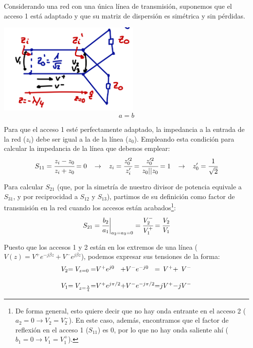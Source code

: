 \documentclass[12pt]{article}
\begin{document}
Considerando una red con una \'unica l\'inea de transmisi\'on, suponemos que el acceso 1 est\'a adaptado y que su matriz de dispersi\'on es sim\'etrica y sin p\'erdidas.
\begin{center}
	\includegraphics[width=7cm]{img/Divisor_en_lambda4_A_detalle.jpg}$$a=b$$
\end{center}

Para que el acceso 1 est\'e perfectamente adaptado, la impedancia a la entrada de la red ($z_i$) debe ser igual a la de la l\'inea ($z_0$). Empleando esta condici\'on para calcular la impedancia de la l\'inea que debenos emplear:
$$S_{11} = \cfrac{z_i - z_0}{z_i + z_0} = 0
\hspace{3mm}\rightarrow\hspace{3mm}
z_i = \cfrac{z'^2_0}{z'_i} = \cfrac{z'^2_0}{z_0 || z_0} = 1
\hspace{3mm}\rightarrow\hspace{3mm}
z'_0 = \cfrac{1}{\sqrt{2}}$$

Para calcular $S_{21}$ (que, por la simetr\'ia de nuestro divisor de potencia equivale a $S_{31}$, y por reciprocidad a $S_{12}$ y $S_{13}$), partimos de su definici\'on como factor de transmisi\'on en la red cuando los accesos est\'an acabados\footnote{De forma general, esto quiere decir que no hay onda entrante en el acceso 2 ($a_2 = 0 \rightarrow V_2 = V_2^-$). En este caso, adem\'as, encontramos que el factor de reflexi\'on en el acceso 1 ($S_{11}$) es 0, por lo que no hay onda saliente ah\'i ($b_1 = 0 \rightarrow V_1 = V_1^+$).}:
$$S_{21} = \cfrac{b_2}{a_1}\bigg|_{a_2 = a_3 = 0} = \cfrac{V_2^-}{V_1^+} = \cfrac{V_2}{V_1}$$

Puesto que los accesos 1 y 2 est\'an en los extremos de una l\'inea ($V(z) = V^+e^{-j\beta z} + V^-e^{j\beta z}$), podemos expresar sus tensiones de la forma:
$$\begin{array}{r@{}l@{=}l@{+}l@{=}r@{}r}
	V_2 &= V_{z=0} & V^+ e^{j0} & V^- e^{-j0} & V^+ +& V^-\\
	\\
	V_1 &= V_{z=\frac{\lambda}{4}} & V^+ e^{j\pi/2} & V^- e^{-j\pi/2} & jV^+ -& jV^- 
\end{array}$$
\end{document}
